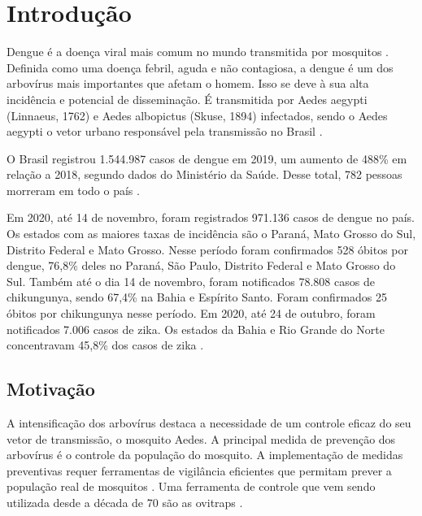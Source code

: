 \documentclass[
	12pt,				%
	openright,			%
	oneside,			%
	a4paper,			%
	chapter=TITLE,		%
	english,			%
	brazil				%
	]{abntex2}
\begin{document}
\textual

\setcounter{page}{12}

\chapter{Introdução}

Dengue é a doença viral mais comum no mundo transmitida por mosquitos \cite{BHATT2013}.
Definida como uma doença febril, aguda e não contagiosa, a dengue é um dos arbovírus mais importantes
que afetam o homem. Isso se deve à sua alta incidência e potencial de disseminação. É transmitida por
Aedes aegypti (Linnaeus, 1762) e Aedes albopictus (Skuse, 1894) infectados, sendo o Aedes aegypti o vetor urbano
responsável pela transmissão no Brasil \cite{ADRIOLI2020}.

O Brasil registrou 1.544.987 casos de dengue em 2019, um aumento de 488\% em relação a 2018, segundo dados do Ministério da Saúde.
Desse total, 782 pessoas morreram em todo o país \cite{G1}.

Em 2020, até 14 de novembro, foram registrados
971.136 casos de dengue no país. Os estados com as maiores taxas de incidência são o Paraná, Mato Grosso do Sul,
Distrito Federal e Mato Grosso. Nesse período foram confirmados 528 óbitos por dengue, 76,8\% deles no Paraná,
São Paulo, Distrito Federal e Mato Grosso do Sul. Também até o dia 14 de novembro, foram notificados 78.808 casos de chikungunya,
sendo 67,4\% na Bahia e Espírito Santo. Foram confirmados 25 óbitos por chikungunya nesse período. Em 2020, até 24 de outubro,
foram notificados 7.006 casos de zika. Os estados da Bahia e Rio Grande do Norte concentravam 45,8\% dos casos de zika \cite{MS}.

\section{Motivação}

A intensificação dos arbovírus destaca a necessidade de
um controle eficaz do seu vetor de transmissão, o mosquito Aedes. A principal
medida de prevenção dos arbovírus é o controle da população do mosquito. A
implementação de medidas preventivas requer ferramentas de vigilância eficientes que
permitam prever a população real de mosquitos \cite{ISMALIZA2019}. Uma ferramenta de controle que vem
sendo utilizada desde a década de 70 são as ovitraps \cite{LOK1977}.
\end{document}
